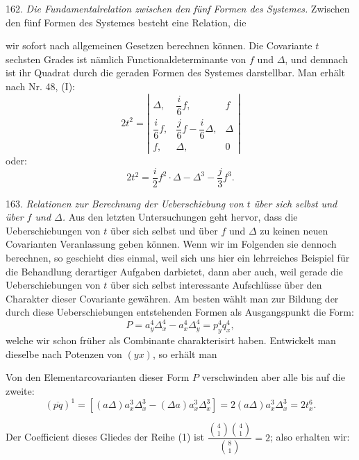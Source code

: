 162. \textit{Die Fundamentalrelation zwischen den fünf Formen des Systemes.} Zwischen den fünf Formen des Systemes besteht eine Relation, die



wir sofort nach allgemeinen Gesetzen berechnen können. Die Covariante $t$ sechsten Grades ist nämlich Functionaldeterminante von $f$ und $\Delta$, und demnach ist ihr Quadrat durch die geraden Formen des Systemes darstellbar. Man erhält nach Nr. 48, (I):
\[
2t^2 = \left|
\begin{array}{ccc}
\Delta, & \dfrac{i}{6} f, & f \\[4pt]
\dfrac{i}{6} f, & \dfrac{j}{6} f - \dfrac{i}{6}\Delta, & \Delta \\[4pt]
f, & \Delta, & 0
\end{array}
\right|
\]
oder:
\[
2t^2 = \frac{i}{2} f^2 \cdot \Delta - \Delta^3 - \frac{j}{3} f^3.
\]

163. \textit{Relationen zur Berechnung der Ueberschiebung von $t$ über sich selbst und über $f$ und $\Delta$.} Aus den letzten Untersuchungen geht hervor, dass die Ueberschiebungen von $t$ über sich selbst und über $f$ und $\Delta$ zu keinen neuen Covarianten Veranlassung geben können. Wenn wir im Folgenden sie dennoch berechnen, so geschieht dies einmal, weil sich uns hier ein lehrreiches Beispiel für die Behandlung derartiger Aufgaben darbietet, dann aber auch, weil gerade die Ueberschiebungen von $t$ über sich selbst interessante Aufschlüsse über den Charakter dieser Covariante gewähren. Am besten wählt man zur Bildung der durch diese Ueberschiebungen entstehenden Formen als Ausgangspunkt die Form:
\[
P = a_y^4 \Delta_x^4 - a_x^4 \Delta_y^4 = p_y^4 q_x^4,
\]
welche wir schon früher als Combinante charakterisirt haben. Entwickelt man dieselbe nach Potenzen von $(yx)$, so erhält man


Von den Elementarcovarianten dieser Form $P$ verschwinden aber alle bis auf die zweite:
\[
(\overline{pq})^1 = [(a\Delta)a_x^3 \Delta_x^3 - (\Delta a)a_x^3\Delta_x^3] = 2(a\Delta)a_x^3\Delta_x^3 = 2t_x^6.
\]

Der Coefficient dieses Gliedes der Reihe (1) ist $\dfrac{\binom{4}{1}\binom{4}{1}}{\binom{8}{1}} = 2$; also erhalten wir:


